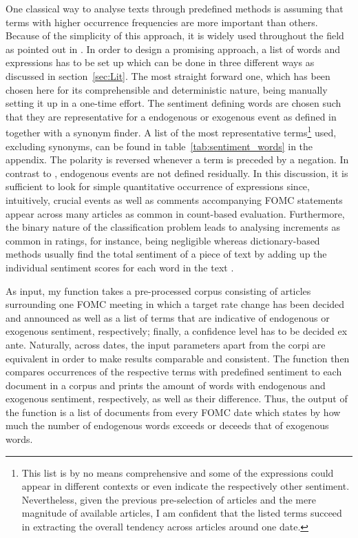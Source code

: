 One classical way to analyse texts through predefined methods is assuming that terms with higher occurrence frequencies are more important than others. Because of the simplicity of this approach, it is widely used throughout the field as pointed out in \textcite{Meyer.2008}. In order to design a promising approach, a list of words and expressions has to be set up which can be done in three different ways as discussed in section~\ref{sec:Lit}. The most straight forward one, which has been chosen here for its comprehensible and deterministic nature, being manually setting it up in a one-time effort. The sentiment defining words are chosen such that they are representative for a endogenous or exogenous event as defined in \textcite{Ellingsen.2003} together with a synonym finder. A list of the most representative terms\footnote{This list is by no means comprehensive and some of the expressions could appear in different contexts or even indicate the respectively other sentiment. Nevertheless, given the previous pre-selection of articles and the mere magnitude of available articles, I am confident that the listed terms succeed in extracting the overall tendency across articles around one date.} used, excluding synonyms, can be found in table~\vref{tab:sentiment_words} in the appendix. The polarity is reversed whenever a term is preceded by a negation. In contrast to \textcite{Ellingsen.2003}, endogenous events are not defined residually.
In this discussion, it is sufficient to look for simple quantitative occurrence of expressions since, intuitively, crucial events as well as comments accompanying FOMC statements appear across many articles as common in count-based evaluation. Furthermore, the binary nature of the classification problem leads to analysing increments as common in ratings, for instance, being negligible whereas dictionary-based methods usually find the total sentiment of a piece of text by adding up the individual sentiment scores for each word in the text \parencite{Silge.2017}. 

As input, my function takes a pre-processed corpus consisting of articles surrounding one FOMC meeting in which a target rate change has been decided and announced as well as a list of terms that are indicative of endogenous or exogenous sentiment, respectively; finally, a confidence level has to be decided ex ante. Naturally, across dates, the input parameters apart from the corpi are equivalent in order to make results comparable and consistent. The function then compares occurrences of the respective terms with predefined sentiment to each document in a corpus and prints the amount of words with endogenous and exogenous sentiment, respectively, as well as their difference. Thus, the output of the function is a list of documents from every FOMC date which states by how much the number of endogenous words exceeds or deceeds that of exogenous words. 

